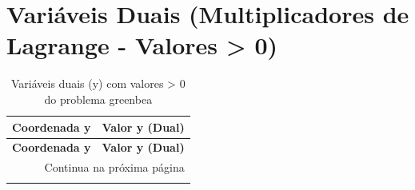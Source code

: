 \documentclass[12pt]{article}
\begin{document}
\section{Variáveis Duais (Multiplicadores de Lagrange - Valores > 0)}

\begin{longtable}{@{}cc@{}}
\caption{Variáveis duais (y) com valores > 0 do problema greenbea} \\
\toprule
\textbf{Coordenada y} & \textbf{Valor y (Dual)} \\
\midrule
\endfirsthead

\toprule
\textbf{Coordenada y} & \textbf{Valor y (Dual)} \\
\midrule
\endhead

\midrule \multicolumn{2}{r}{{Continua na próxima página}} \\ \midrule
\endfoot


\end{longtable}
\end{document}

